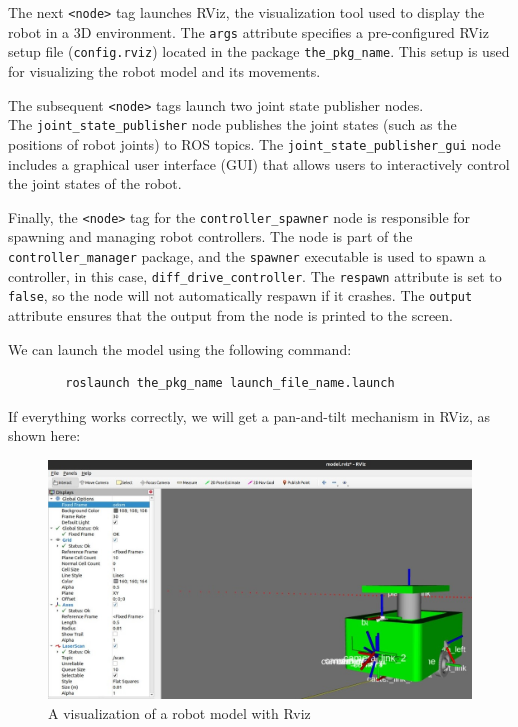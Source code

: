 \documentclass[../../main]{subfiles}
\begin{document}
    The next \texttt{<node>} tag launches RViz, the visualization tool used to display the robot in a 3D environment. The \texttt{args} attribute specifies a pre-configured RViz setup file (\texttt{config.rviz}) located in the package \texttt{the\_pkg\_name}. This setup is used for visualizing the robot model and its movements.
    
    The subsequent \texttt{<node>} tags launch two joint state publisher nodes.\\ The \texttt{joint\_state\_publisher} node publishes the joint states (such as the positions of robot joints) to ROS topics. The \texttt{joint\_state\_publisher\_gui} node includes a graphical user interface (GUI) that allows users to interactively control the joint states of the robot.
    
    Finally, the \texttt{<node>} tag for the \texttt{controller\_spawner} node is responsible for spawning and managing robot controllers. The node is part of the \texttt{controller\_manager} package, and the \texttt{spawner} executable is used to spawn a controller, in this case, \texttt{diff\_drive\_controller}. The \texttt{respawn} attribute is set to \texttt{false}, so the node will not automatically respawn if it crashes. The \texttt{output} attribute ensures that the output from the node is printed to the screen.
    
    We can launch the model using the following command:
    \begin{verbatim}
        roslaunch the_pkg_name launch_file_name.launch
    \end{verbatim}
    If everything works correctly, we will get a pan-and-tilt mechanism in RViz, as shown
    here:
    \begin{figure}[h!]
        \centering
        \includegraphics[width=\textwidth]{img/roborRvz.jpg}
        \caption{A visualization of a robot model with Rviz}

    \end{figure}
    \newpage
\end{document}
